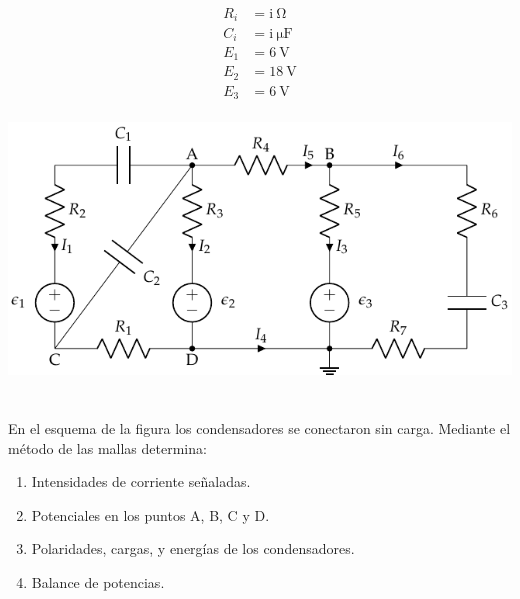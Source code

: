 \documentclass[12pt]{article}
\begin{document}
\begin{minipage}[c]{0.3\textwidth}
  \begin{align*}
    R_i &= \mathrm{i\ } \si{\ohm}\\
    C_i &= \mathrm{i\ } \si{\micro\farad}\\
    E_1 &= \SI{6}{\volt}\\
    E_2 &= \SI{18}{\volt}\\
    E_3 &= \SI{6}{\volt}\\
  \end{align*}
\end{minipage}
\begin{minipage}[c]{0.7\textwidth}
  \includegraphics[width=\textwidth]{figs/nudos_condensadores.pdf}
\end{minipage}

\section{}

  En el esquema de la figura los condensadores se conectaron sin carga. Mediante el método de las mallas determina:
  \begin{enumerate}
  \item Intensidades de corriente señaladas.
  \item Potenciales en los puntos A, B, C y D.
  \item Polaridades, cargas, y energías de los condensadores.
  \item Balance de potencias.
  \end{enumerate}
\end{document}

